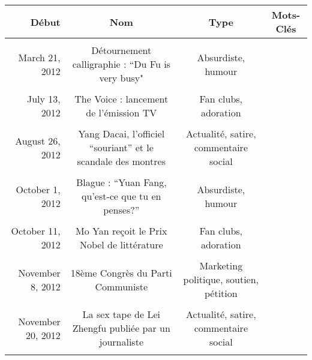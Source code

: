\begin{table}[ht!]
    \begin{minipage}{22cm}
        \begin{turn}{90}
    \begin{tabulary}{\linewidth}{ r| C C C}

        \textbf{Début} & 
        \textbf{Nom} &  
        \textbf{Type} &  
        \textbf{Mots-Clés} \\

        \hline \\[-1.5ex]

        March 21, 2012 &
        Détournement calligraphie : “Du Fu is very busy" &
        Absurdiste, humour &
         \\[5ex]
        \hline \\[-1.5ex]

        July 13, 2012 &  
        The Voice : lancement de l'émission TV &
         Fan clubs, adoration & 
         \\[5ex]
        \hline \\[-1.5ex]

        August 26, 2012 &
        Yang Dacai, l'officiel ``souriant'' et le scandale des montres &   
        Actualité, satire, commentaire social &  
         \\[5ex]
        \hline \\[-1.5ex]

        October 1, 2012 & 
        Blague : ``Yuan Fang, qu'est-ce que tu en penses?''  & 
        Absurdiste, humour & 
         \\[5ex]
        \hline \\[-1.5ex]


        October 11, 2012  &
        Mo Yan reçoit le Prix Nobel de littérature &
        Fan clubs, adoration  &
         \\[5ex]
        \hline \\[-1.5ex]


        November 8, 2012 &
        18ème Congrès du Parti Communiste &
        Marketing politique, soutien, pétition &
        \\[5ex]
        \hline \\[-1.5ex]

        November 20, 2012 &
        La sex tape de Lei Zhengfu publiée par un journaliste &
        Actualité, satire, commentaire social &
        \\[5ex]
        \hline \\[-1.5ex]


\end{tabulary}
\end{turn}
\end{minipage}
\end{table}
